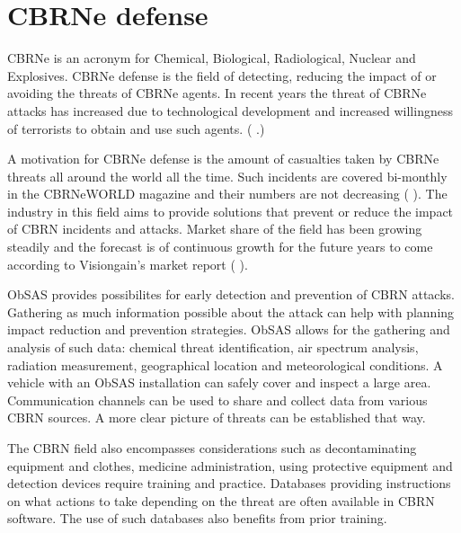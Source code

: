 \documentclass[12pt, a4paper,oneside, nocenter]{thesis}
\renewcommand{\citep}[1]{(\citeauthor{#1} \citeyear{#1}.)}
\renewcommand{\citeyearpar}[1]{(\citeauthor{#1} \citeyear{#1})}
\newcommand{\citeyeartitlexamkinline}[1]{(\usebibentry{#1}{title} \citeyear{#1})}
\begin{document}
\section{CBRNe defense}
CBRNe is an acronym for Chemical, Biological, Radiological, Nuclear and Explosives. CBRNe defense is the field of detecting, reducing the impact of or avoiding the threats of CBRNe agents. In recent years the threat of CBRNe attacks has increased due to technological development and increased willingness of terrorists to obtain and use such agents. \citep{crowd-behavior}
\par
A motivation for CBRNe defense is the amount of casualties taken by CBRNe threats all around the world all the time. Such incidents are covered bi-monthly in the CBRNeWORLD magazine and their numbers are not decreasing \citeyearpar{cbrne-world}. The industry in this field aims to provide solutions that prevent or reduce the impact of CBRN incidents and attacks. Market share of the field has been growing steadily and the forecast is of continuous growth for the future years to come according to Visiongain's market report \citeyeartitlexamkinline{cbrn-market-share}.
\par
ObSAS provides possibilites for early detection and prevention of CBRN attacks. Gathering as much information possible about the attack can help with planning impact reduction and prevention strategies. ObSAS allows for the gathering and analysis of such data: chemical threat identification, air spectrum analysis, radiation measurement, geographical location and meteorological conditions. A vehicle with an ObSAS installation can safely cover and inspect a large area. Communication channels can be used to share and collect data from various CBRN sources. A more clear picture of threats can be established that way.\par
The CBRN field also encompasses considerations such as decontaminating equipment and clothes, medicine administration, using protective equipment and detection devices require training and practice. Databases providing instructions on what actions to take depending on the threat are often available in CBRN software. The use of such databases also benefits from prior training.
\end{document}

